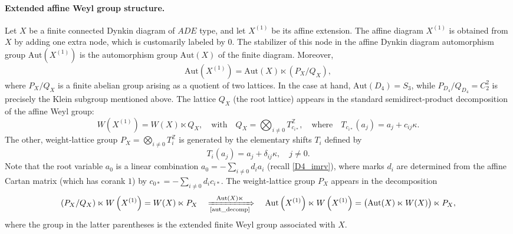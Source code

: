 \documentclass[12pt,a4paper]{article}
\numberwithin{equation}{section}
\begin{document}
\paragraph{Extended affine Weyl group structure.}
Let $X$ be a finite connected Dynkin diagram of $ADE$ type, and let $X^{(1)}$ be its affine extension. The affine diagram $X^{(1)}$ is obtained from $X$ by adding one extra node, which is customarily labeled by $0$. The stabilizer of this node in the affine Dynkin diagram automorphism group $\mathrm{Aut}\left(X^{(1)}\right)$ is the automorphism group $\mathrm{Aut}(X)$ of the finite diagram. Moreover,
\begin{equation}\label{aut_decomp}
\mathrm{Aut}\left(X^{(1)}\right)=\mathrm{Aut}(X)\ltimes(P_X/Q_X),
\end{equation}
where $P_X/Q_X$ is a finite abelian group arising as a quotient of two lattices. In the case at hand, $\mathrm{Aut}(D_4)=S_3$, while $P_{D_4}/Q_{D_4}=C_2^2$ is precisely the Klein subgroup mentioned above. 
The lattice $Q_X$ (the root lattice) appears in the standard semidirect-product decomposition of the affine Weyl group:
\begin{equation}
W\left(X^{(1)}\right)=W(X)\ltimes Q_X,  \quad \textrm{with} \quad Q_X=\bigotimes_{i\neq0}T^{\mathbb{Z}}_{c_{i*}}, \quad \textrm{where} \quad T_{c_{i*}}(a_j)=a_j+c_{ij}\kappa. 
\end{equation}
The other, weight-lattice group $P_X=\bigotimes\limits_{i\neq0}T^{\mathbb{Z}}_i$ is generated by the elementary shifts $T_i$ defined by
\begin{equation}\label{elem_transl_root}
T_i(a_j)=a_j+\delta_{ij}\kappa, \quad j\neq0.
\end{equation}
Note that the root variable $a_0$ is a linear combination $a_0=-\sum_{i\neq0}d_ia_i$ (recall \eqref{D4_imrv}), where marks $d_i$ are determined from the affine Cartan matrix (which has corank $1$) by $c_{0*}=-\sum_{i\neq0}d_ic_{i*}$. 
The weight-lattice group $P_X$ appears in the decomposition
\begin{equation}\label{Pdecomp}
(P_X/Q_X)\ltimes W\left(X^{(1)}\right)=W(X)\ltimes P_X \quad \xRightarrow[\textrm{\eqref{aut_decomp}}]{\mathrm{Aut}(X)\ltimes} \quad \mathrm{Aut}\left(X^{(1)}\right)\ltimes W\left(X^{(1)}\right)=\big(\mathrm{Aut}(X)\ltimes W(X)\big)\ltimes P_X,
\end{equation}
where the group in the latter parentheses is the extended finite Weyl group associated with $X$. 
\end{document}
